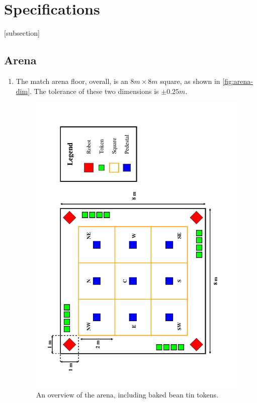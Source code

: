 \section{Specifications}
\label{sec:Specifications}

[subsection]
\newcommand{\rcnii}{\stepcounter{rulei}\arabic{section}.\arabic{subsection}.\arabic{rulei}}
\renewcommand{\labelenumi}{\rcnii}

\subsection{Arena}
\label{sub:arena}
\begin{enumerate}
\item The match arena floor, overall, is an $8m \times 8m$ square, as shown in \autoref{fig:arena-dim}.
 The tolerance of these two dimensions is $\pm0.25m$.

\begin{figure}
  \includegraphics[keepaspectratio, clip, width=\textwidth]{./images/arena.pdf}
  \caption{\label{fig:arena-dim}An overview of the arena, including baked bean tin tokens.}
\end{figure}



\end{enumerate}
